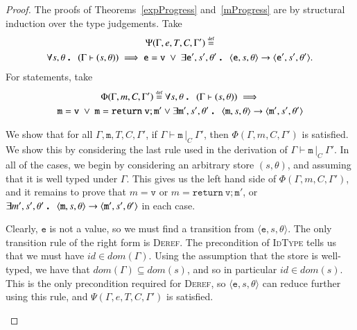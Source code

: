 \documentclass[12pt,a4paper,twoside,openright]{report}
\theoremstyle{definition}
\theoremstyle{dotless}
\newcommand{\typable}[2][ ]{\Gamma{}\vdash\mathtt{#2}\, |_C#1\:\Gamma#1'}
\newcommand{\transition}[6]{\langle{}\mathtt{#1},#2,#3\rangle{}\rightarrow{}\langle{}\mathtt{#4},#5,#6\rangle}
\newcommand{\indHyp}{\Phi(\Gamma, m, C, \Gamma')}
\newcommand{\indHypTwo}{\Psi(\Gamma, e, T, C, \Gamma')}
\newcommand\eqdef{\mathrel{\overset{\makebox[0pt]{\mbox{\normalfont\tiny def}}}{=}}}
\newcommand\qdot{\mathbin{\scalebox{1.5}{.}}\enspace}
\begin{document}
\begin{proof}
  The proofs of Theorems~\ref{expProgress} and~\ref{mProgress} are by structural induction over the type judgements.
  Take
  \begin{multline*}
  	\indHypTwo \eqdef \\
  	\forall s,\theta\qdot (\Gamma \vdash (s,\theta))\implies \mathtt{e}=\mathtt{v}\ \vee\ 
 	\exists \mathtt{e}', s',\theta'\qdot \transition{e}{s}{\theta}{e'}{s'}{\theta'}.
  \end{multline*}
	For statements, take 
  \begin{multline*}
  	\indHyp \eqdef
  	\forall s,\theta\qdot (\Gamma \vdash (s,\theta))\implies \\
  	\mathtt{m}=\mathtt{v}\ \vee\ \mathtt{m}=\mathtt{return\ v; m'} \vee
  	\exists \mathtt{m}', s',\theta'\qdot \transition{m}{s}{\theta}{m'}{s'}{\theta'}
  \end{multline*}

  We show that for all $\Gamma, \mathtt{m}, T, C, \Gamma'$, if $\typable{m}$, then
  $\indHyp$ is satisfied. We show this by considering the last rule used in
  the derivation of $\typable{m}$. In all of the cases, we begin by considering an arbitrary store
  $(s,\theta)$, and assuming that it is well typed under $\Gamma$. This gives
  us the left hand side of $\indHyp$, and it remains to prove that
  $m=\mathtt{v}$ or $m=\mathtt{return\ v; m'}$, or $\exists m', s',\theta'\qdot
  \transition{m}{s}{\theta}{m'}{s'}{\theta'}$ in each case.

  \begin{case}[IdType]

	Clearly, $\mathtt{e}$ is not a
	value, so we must find a transition from $\langle \mathtt{e}, s, \theta\rangle$. The
	only transition rule of the right form is \textsc{Deref}. The precondition
	of \textsc{IdType} tells us that we must have $id \in dom(\Gamma)$. Using
	the assumption that the store is well-typed, we have that
	$dom(\Gamma)\subseteq dom(s)$, and so in particular $id \in dom(s)$. This
	is the only precondition required for \textsc{Deref}, so $\langle \mathtt{e},
	s,\theta \rangle$ can reduce further using this rule, and $\indHypTwo$ is
	satisfied.
	
  \end{case}

  \begin{case}[PropType]\label{proptype}
	

\end{case}
\end{proof}
\end{document}
